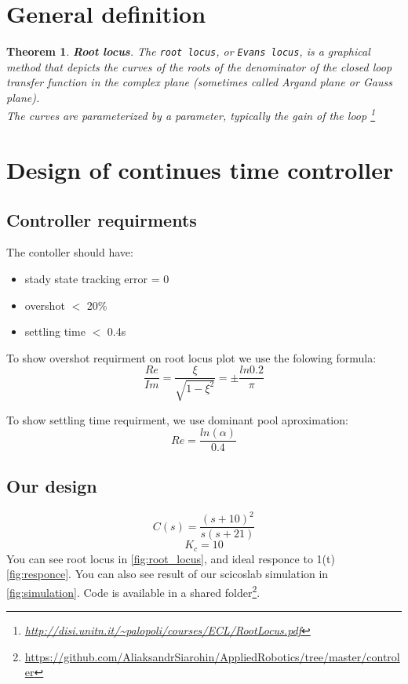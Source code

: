 \documentclass[a4paper,12pt,oneside]{article}
\newtheorem{thm}[equation]{Theorem}
\begin{document}
\section{General definition}

\begin{thm}
\textbf{Root locus}. The \texttt{root locus}, or \texttt{Evans locus}, is a graphical method that
depicts the curves of the roots of the denominator of the
closed loop transfer function in the complex plane
(sometimes called Argand plane or Gauss plane). \\ The curves are parameterized by a parameter, typically the
gain of the loop  \footnote{\url{http://disi.unitn.it/~palopoli/courses/ECL/RootLocus.pdf}}
\end{thm}

\section{Design of continues time controller}
\subsection{Controller requirments}
The contoller should have:
\begin{itemize}
\item stady state tracking error = 0
\item overshot $<$ 20\%
\item settling time $<$ 0.4s
\end{itemize}
To show overshot requirment on root locus plot we use the folowing formula:
\begin{equation}
\frac{Re}{Im} = \frac{\xi}{\sqrt{1-\xi^{2}}} = \pm\frac{ln{0.2}}{\pi}
\end{equation}

To show settling time requirment, we use dominant pool aproximation:
\begin{equation}
Re = \frac{ln(\alpha)}{0.4}
\end{equation}

\subsection{Our design}
\begin{equation}
C(s) = \frac{(s+10)^2}{s(s+21)}
\end{equation}
\begin{equation}
K_c = 10
\end{equation}
You can see root locus in \cref{fig:root_locus}, and ideal responce to 1(t) \cref{fig:responce}. You can also see result of our scicoslab simulation  in \cref{fig:simulation}. Code is available in a shared folder\footnote{\url{https://github.com/AliaksandrSiarohin/AppliedRobotics/tree/master/controler}}.
\end{document}
